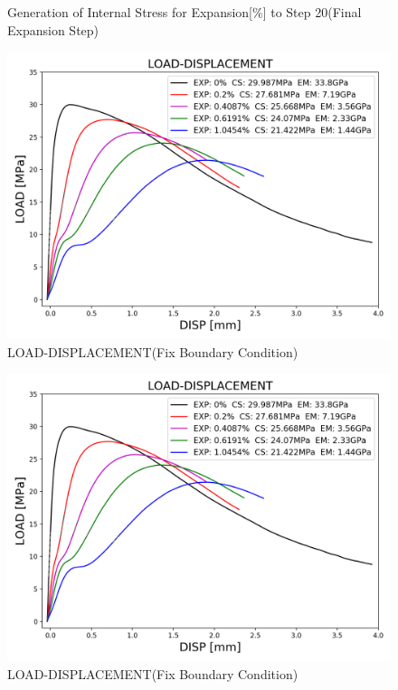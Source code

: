 \begin{figure}[ht!]
    

\caption{Generation of Internal Stress for Expansion[\%] to Step 20(Final Expansion Step)}
\label{fig:A30_stress}
\end{figure}

\begin{figure}[ht!]
    \centering
    \includegraphics[width=0.8\linewidth]{Files/exp_3D/DEF/S13A30FIXX-1-LOAD-DISPLACEMENT.png}
    \caption{LOAD-DISPLACEMENT(Fix Boundary Condition)}
    \label{fig:S13A30FIXX-1-LOAD-DISPLACEMENT}
\end{figure}


\begin{figure}[ht!]
    \centering
    \includegraphics[width=0.8\linewidth]{Files/exp_3D/DEF/S13A30FIXX-1-LOAD-DISPLACEMENT.png}
    \caption{LOAD-DISPLACEMENT(Fix Boundary Condition)}
    \label{fig:S13A30X-1CFIX-LOAD-DISPLACEMENT}
\end{figure}

